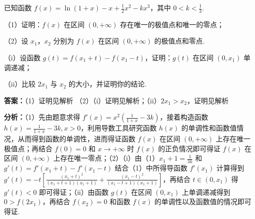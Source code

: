 \begin{question}[points=17]
已知函数 $f(x)=\ln(1+x)-x+\frac{1}{2}x^2-kx^3$，其中 $0<k<\frac{1}{3}$.

（1）证明：$f(x)$ 在区间 $(0,+\infty)$ 存在唯一的极值点和唯一的零点；

（2）设 $x_1$，$x_2$ 分别为 $f(x)$ 在区间 $(0,+\infty)$ 的极值点和零点.

（i）设函数 $g(t)=f(x_1+t)-f(x_1-t)$，证明：$g(t)$ 在区间 $(0,x_1)$ 单调递减；

（ii）比较 $2x_1$ 与 $x_2$ 的大小，并证明你的结论.
\begin{solution}
\textbf{答案：}（1）证明见解析
（2）（i）证明见解析；（ii）$2x_1>x_2$，证明见解析

\textbf{分析：}（1）先由题意求得 $f'(x)=x^2\left(\frac{1}{1+x}-3k\right)$，接着构造函数 $h(x)=\frac{1}{1+x}-3k,x>0$，利用导数工具研究函数 $h(x)$ 的单调性和函数值情况，从而得到函数的单调性，进而得证函数 $f(x)$ 在区间 $(0,+\infty)$ 上存在唯一极值点；再结合 $f(0)=0$ 和 $x\to+\infty$ 时 $f(x)$ 的正负情况即可得证 $f(x)$ 在区间 $(0,+\infty)$ 上存在唯一零点；（2）（i）由（1）$x_1+1=\frac{1}{3k}$ 和 $g'(t)=f'(x_1+t)-f'(x_1-t)$ 结合（1）中所得导函数 $f'(x_1)$ 计算得到 $g'(t)=-t\left[\frac{(x_1+t)^2}{(x_1+t+1)(x_1+1)}+\frac{(x_1-t)^2}{(x_1-t+1)(x_1+1)}\right]$，再结合 $t\in(0,x_1)$ 得 $g'(t)<0$ 即可得证；（ii）由函数 $g(t)$ 在区间 $(0,x_1)$ 上单调递减得到 $0>f(2x_1)$，再结合 $f(x_2)=0$ 和函数 $f(x)$ 的单调性以及函数值的情况即可得证.


\end{solution}
\end{question}
